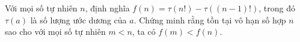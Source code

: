 \ifshowproblem
\begin{problem}\label{example:CHN-2015-TST3-P6}
	Với mọi số tự nhiên $n$, định nghĩa $f(n) = \tau(n!) - \tau((n - 1)!)$, trong đó $\tau(a)$ là số lượng ước dương của $a$.
	Chứng minh rằng tồn tại vô hạn số hợp $n$ sao cho với mọi số tự nhiên $m < n$, ta có $f(m) < f(n)$.
\end{problem}
\fi

\footnotemark
{}
\fi